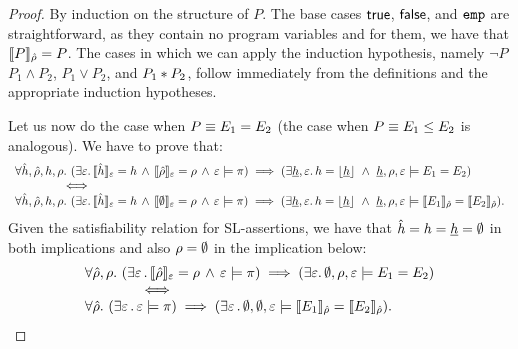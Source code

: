 \newpage

\begin{proof}
By induction on the structure of $P$. The base cases ${\sf true}$, ${\sf false}$, and $\texttt{emp}$ are straightforward, as they contain no program variables and for them, we have that $\llbracket P \rrbracket_{\hat\rho} = P$. The cases in which we can apply the induction hypothesis, namely $\neg P$ $P_1 \wedge P_2$, $P_1 \vee P_2$, and $P_1 \mathbin{*} P_2$, follow immediately from the definitions and the appropriate induction hypotheses.

Let us now do the case when $P \equiv E_1 = E_2$ (the case when $P \equiv E_1 \leq E_2$ is analogous). We have to prove that:
$$\begin{array}{l}
\forall \sheap, \sstore, \heap, \store. \ (\exists \senv. \,  \semexpr{\sheap}{\senv} = \heap \, \wedge \, \semexpr{\sstore}{\senv} = \store \, \wedge \,  \senv \satisfies \pc) \implies
(\exists \iheap, \senv. \,  \heap = \deabstract{\iheap} \ \wedge \ \iheap, \store, \senv \satisfies \lexpr_1 = \lexpr_2 )
\\
\qquad \qquad \iff \\
\forall \sheap, \sstore, \heap, \store. \ (\exists \senv. \,  \semexpr{\sheap}{\senv} = \heap \, \wedge \, \semexpr{\emptystore}{\senv} = \store \, \wedge \,  \senv \satisfies \pc) \implies
(\exists \iheap, \senv. \,  \heap = \deabstract{\iheap} \ \wedge \ \iheap, \store, \senv \satisfies \symbeval{\lexpr_1}{\sstore} = \symbeval{\lexpr_2}{\sstore} ).
\end{array}$$
Given the satisfiability relation for SL-assertions, we have that $\hat{h} = h = \underline{h} = \emptyset$ in both implications and also $\rho = \emptyset$ in the implication below:
$$\begin{array}{l}
\forall \hat\rho, \rho. \ (\exists \varepsilon \, . \, \llbracket \hat\rho \rrbracket_{\varepsilon} = \rho \, \wedge \,  \varepsilon \models \pi) \implies
(\exists \varepsilon. \, \emptyset, \rho, \varepsilon \models E_1 = E_2 )
\\
\qquad \qquad \iff \\
\forall \hat\rho. \ (\exists \varepsilon \, . \, \varepsilon \models \pi) \implies
(\exists \varepsilon \, . \,  \emptyset, \emptyset, \varepsilon \models \llbracket E_1 \rrbracket_{\hat\rho} = \llbracket E_2 \rrbracket_{\hat\rho}).
\end{array}$$


\end{proof}
